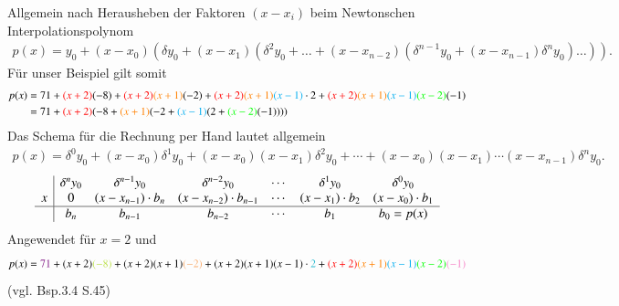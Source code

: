 \documentclass[10pt,a4paper]{article}
\begin{document}
Allgemein nach Herausheben der Faktoren $(x-x_i)$ beim Newtonschen Interpolationspolynom
\begin{align*}
	p(x)=y_0+(x-x_0)(\delta y_0+ (x-x_1)(\delta^2y_0+\dots+(x-x_{n-2})(\delta^{n-1}y_0+(x-x_{n-1})\delta^n y_0)\dots)).
\end{align*}
Für unser Beispiel gilt somit
\begin{align*}
p(x) & = 71 + {\color{red}(x+2)}(-8) + {\color{red}(x+2)}{\color{orange}(x+1)}(-2) + {\color{red}(x+2)}{\color{orange}(x+1)}{\color{cyan}(x-1)}\cdot 2 + {\color{red}(x+2)}{\color{orange}(x+1)}{\color{cyan}(x-1)}{\color{green}(x-2)}(-1) \\
& = 71 + {\color{red}(x+2)}(-8 + {\color{orange}(x+1)}(-2 + {\color{cyan}(x-1)}(2 + {\color{green}(x-2)}(-1)))) 
\end{align*}
Das Schema für die Rechnung per Hand lautet allgemein
\begin{align*}
p(x) = \delta^0 y_0 + (x-x_0)\delta^1 y_0 + (x-x_0)(x-x_1)\delta^2 y_0 + \cdots + (x-x_0)(x-x_1)\cdots(x-x_{n-1})\delta^n y_0.
\end{align*}
\begin{align*}
\begin{array}[htbp]{c|cccccc}
	  & \delta^n y_0 & \delta^{n-1} y_0     & \delta^{n-2} y_0         & \cdots & \delta^1 y_0     & \delta^0 y_0     \\
	x & 0            & (x-x_{n-1})\cdot b_n & (x-x_{n-2})\cdot b_{n-1} & \cdots & (x-x_1)\cdot b_2 & (x-x_0)\cdot b_1 \\ \hline
	  & b_n          & b_{n-1}              & b_{n-2}                  & \cdots & b_1              & b_0=p(x)
\end{array}
\end{align*}
Angewendet für $x=2$ und 
\begin{align*}
	p(x) = {\color{Fuchsia}71} + (x+2){\color{SpringGreen}(-8)} + (x+2)(x+1){\color{Apricot}(-2)} + (x+2)(x+1)(x-1)\cdot{\color{Turquoise}2} + {\color{red}(x+2)}{\color{orange}(x+1)}{\color{cyan}(x-1)}{\color{green}(x-2)}{\color{Lavender}(-1)}
\end{align*}
(vgl. Bsp.3.4 S.45)
\end{document}
